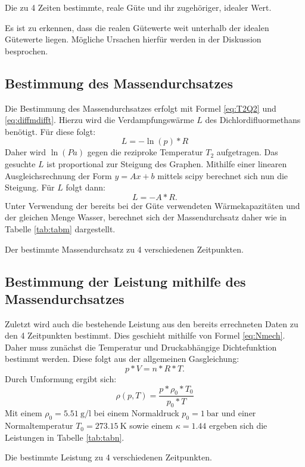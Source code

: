 \begin{table}
  \centering
  \caption{Die zu 4 Zeiten bestimmte, reale Güte und ihr zugehöriger, idealer Wert.}
  \label{tab:Guete}
\end{table}

Es ist zu erkennen, dass die realen Gütewerte weit unterhalb der idealen Gütewerte liegen.
Mögliche Ursachen hierfür werden in der Diskussion besprochen.

\subsection{Bestimmung des Massendurchsatzes}
Die Bestimmung des Massendurchsatzes erfolgt mit Formel \ref{eq:T2Q2} und \ref{eq:diffmdifft}.
Hierzu wird die Verdampfungswärme $L$ des Dichlordifluormethans benötigt. Für diese folgt:
\begin{equation}
  L = -\ln(p)*R
\end{equation}
Daher wird $\ln(Pa)$ gegen die reziproke Temperatur $T_2$ aufgetragen. Das gesuchte $L$ ist proportional zur Steigung des Graphen.
Mithilfe einer linearen Ausgleichsrechnung der Form $y=Ax+b$ mittels scipy
berechnet sich nun die Steigung. Für $L$ folgt dann:
\begin{equation}
  L = -A*R\text{.}\label{eq:LausA}
\end{equation}
Unter Verwendung der bereits bei der Güte verwendeten Wärmekapazitäten und der gleichen
 Menge Wasser, berechnet sich der Massendurchsatz daher wie in Tabelle \ref{tab:tabm} dargestellt.

 \begin{table}
   \centering
   \caption{Der bestimmte Massendurchsatz zu 4 verschiedenen Zeitpunkten.}
   \label{tab:massen}
 \end{table}

\subsection{Bestimmung der Leistung mithilfe des Massendurchsatzes}
Zuletzt wird auch die bestehende Leistung aus den bereits errechneten Daten zu den 4 Zeitpunkten bestimmt.
Dies geschieht mithilfe von Formel \ref{eq:Nmech}. Daher muss zunächst die Temperatur
und Druckabhängige Dichtefunktion bestimmt werden. Diese folgt aus der allgemeinen Gasgleichung:
\begin{equation}
  p*V = n*R*T\text{.}
\end{equation}
Durch Umformung ergibt sich:
\begin{equation}
  \rho(p,T) = \frac{p*\rho_0*T_0}{p_0*T}
\end{equation}
Mit einem $\rho_0 = \SI{5.51}{\gram\per\litre}$ \cite{V206} bei einem Normaldruck $p_0 = \SI{1}{\bar}$
und einer Normaltemperatur $T_0 = \SI{273.15}{\kelvin}$ sowie einem $\kappa = 1.44$ \cite{V206} ergeben sich die Leistungen in Tabelle \ref{tab:tabn}.

\begin{table}
  \centering
  \caption{Die bestimmte Leistung zu 4 verschiedenen Zeitpunkten.}
  \label{tab:Leistung}
\end{table}
